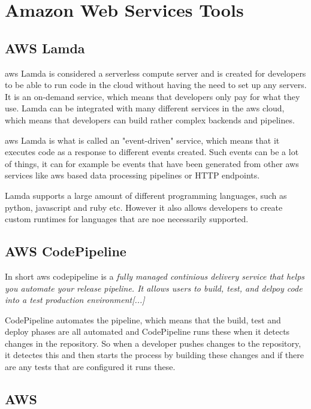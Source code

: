 \section{Amazon Web Services Tools}
\subsection{AWS Lamda}
\acrshort{aws} Lamda is considered a serverless compute server and is created for developers to be able to run code in the cloud without having the need to set up any servers. It is an on-demand service, which means that developers only pay for what they use. Lamda can be integrated with many different services in the \acrshort{aws} cloud, which means that developers can build rather complex backends and pipelines. 

\acrshort{aws} Lamda is what is called an "event-driven" service, which means that it executes code as a response to different events created. Such events can be a lot of things, it can for example be events that have been generated from other \acrshort{aws} services like \acrshort{aws} based data processing pipelines or HTTP endpoints. 

Lamda supports a large amount of different programming languages, such as python, javascript and ruby etc. However it also allows developers to create custom runtimes for languages that are noe necessarily supported. \cite{AWSLamda}

\subsection{AWS CodePipeline}
In short \acrshort{aws} codepipeline is a \textit{fully managed continious delivery service that helps you automate your release pipeline. It allows users to build, test, and delpoy code into a test production environment[...]}
\cite{AWSCodePipeline}

CodePipeline automates the pipeline, which means that the build, test and deploy phases are all automated and CodePipeline runs these when it detects changes in the repository. So when a developer pushes changes to the repository, it detectes this and then starts the process by building these changes and if there are any tests that are configured it runs these. \cite{AWSCodePipeline1}
\subsection{AWS }